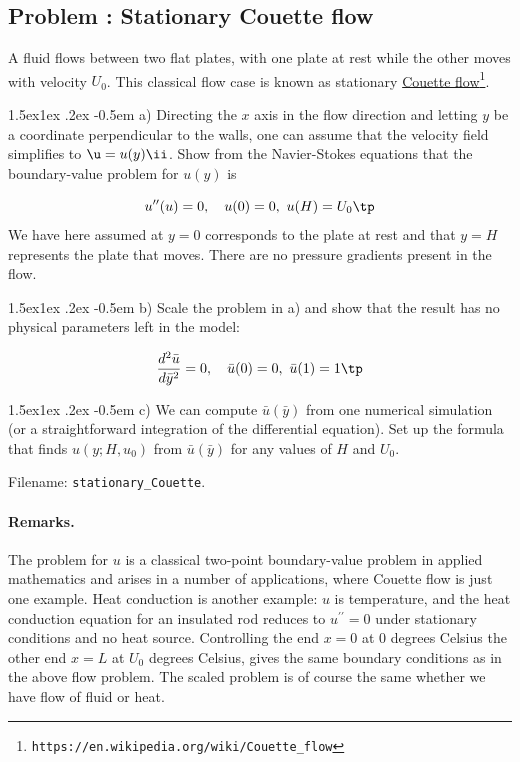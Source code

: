 \documentclass[graybox,envcountchap,sectrefs,final]{svmonodo}
\makeatletter
\newcounter{doconce:movie:counter}
\newenvironment{doconceexercise}{}{}
\newcounter{doconceexercisecounter}
\newcommand\subex{\@startsection{paragraph}{4}{\z@}%
                  {1.5ex\@plus1ex \@minus.2ex}%
                  {-0.5em}%
                  {\normalfont\normalsize\bfseries}}
\makeatother
\begin{document}
\begin{doconceexercise}

\subsection*{Problem \thedoconceexercisecounter: Stationary Couette flow}

\label{scale:vib:exer:stationary_Couette}

A fluid flows between two flat plates, with one plate at rest while
the other moves with velocity $U_0$. This classical flow case is known as
stationary \href{{https://en.wikipedia.org/wiki/Couette_flow}}{Couette flow}\footnote{\texttt{https://en.wikipedia.org/wiki/Couette\_flow}}.


\subex{a)}
Directing the $x$ axis in the flow direction and letting $y$ be
a coordinate perpendicular to the walls, one can assume that
the velocity field simplifies to $\u = u(y)\ii$.
Show from the Navier-Stokes equations that the boundary-value problem
for $u(y)$ is

\[ u^{\prime\prime}(u) = 0,\quad u(0)=0,\ u(H)=U_0\tp\]
We have here assumed at $y=0$ corresponds to the plate at rest and
that $y=H$ represents the plate that moves. There are no pressure
gradients present in the flow.

\subex{b)}
Scale the problem in a) and show that the result has no physical parameters
left in the model:

\[ \frac{d^2\bar u}{d\bar y^2} = 0,\quad \bar u(0)=0,\ \bar u(1)=1\tp\]

\subex{c)}
We can compute $\bar u(\bar y)$ from one numerical simulation (or a
straightforward integration of the differential equation). Set up
the formula that finds $u(y; H, u_0)$ from $\bar u(\bar y)$ for any
values of $H$ and $U_0$.



\noindent Filename: \Verb!stationary_Couette!.


\paragraph{Remarks.}
The problem for $u$ is a classical two-point boundary-value problem
in applied mathematics and arises in a number of applications, where
Couette flow is just one example. Heat conduction is another
example: $u$ is temperature, and the heat conduction equation for
an insulated rod reduces to $u^{\prime\prime}=0$ under stationary
conditions and no heat source.
Controlling the end $x=0$ at 0 degrees Celsius the other end $x=L$
at $U_0$ degrees
Celsius, gives the same boundary conditions as in the above flow problem.
The scaled problem is of course the same whether we have flow of
fluid or heat.


\end{doconceexercise}
\end{document}
